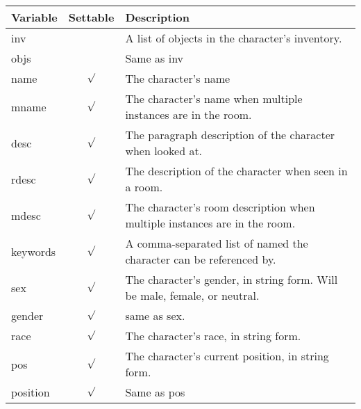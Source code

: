 \documentclass[12pt]{article}
\begin{document}
\begin{tabular}{|l|c|l|}
\hline
Variable & Settable & Description \\
\hline
inv     & & A list of objects in the character's inventory. \\
objs    & & Same as inv \\
name    & \begin{math}\surd\end{math} & The character's name \\
mname   & \begin{math}\surd\end{math} & The character's name when multiple instances are in the room. \\
desc    & \begin{math}\surd\end{math} & The paragraph description of the character when looked at. \\
rdesc   & \begin{math}\surd\end{math} & The description of the character when seen in a room. \\
mdesc   & \begin{math}\surd\end{math} & The character's room description when multiple instances are in the room. \\
keywords & \begin{math}\surd\end{math} & A comma-separated list of named the character can be referenced by. \\ 
sex     & \begin{math}\surd\end{math} & The character's gender, in string form. Will be male, female, or neutral. \\
gender  & \begin{math}\surd\end{math} & same as sex. \\
race    & \begin{math}\surd\end{math} & The character's race, in string form. \\
pos     & \begin{math}\surd\end{math} & The character's current position, in string form. \\
position& \begin{math}\surd\end{math} & Same as pos \\

\end{tabular}
\end{document}
